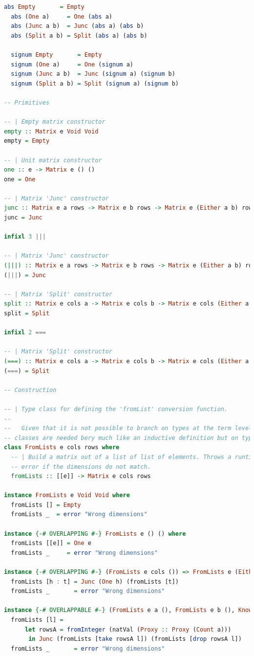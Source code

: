 \documentclass[
  oneside,
  11pt, a4paper,
  footinclude=true,
  headinclude=true,
  cleardoublepage=empty
]{scrbook}
\theoremstyle{definition}
\theoremstyle{definition}
\begin{document}
\begin{lstlisting}[language=Haskell, caption={Matrix.Internal},captionpos=b]
  abs Empty       = Empty
  abs (One a)     = One (abs a)
  abs (Junc a b)  = Junc (abs a) (abs b)
  abs (Split a b) = Split (abs a) (abs b)

  signum Empty       = Empty
  signum (One a)     = One (signum a)
  signum (Junc a b)  = Junc (signum a) (signum b)
  signum (Split a b) = Split (signum a) (signum b)

-- Primitives

-- | Empty matrix constructor
empty :: Matrix e Void Void
empty = Empty

-- | Unit matrix constructor
one :: e -> Matrix e () ()
one = One

-- | Matrix 'Junc' constructor
junc :: Matrix e a rows -> Matrix e b rows -> Matrix e (Either a b) rows
junc = Junc

infixl 3 |||

-- | Matrix 'Junc' constructor
(|||) :: Matrix e a rows -> Matrix e b rows -> Matrix e (Either a b) rows
(|||) = Junc

-- | Matrix 'Split' constructor
split :: Matrix e cols a -> Matrix e cols b -> Matrix e cols (Either a b)
split = Split

infixl 2 ===

-- | Matrix 'Split' constructor
(===) :: Matrix e cols a -> Matrix e cols b -> Matrix e cols (Either a b)
(===) = Split

-- Construction

-- | Type class for defining the 'fromList' conversion function.
--
--   Given that it is not possible to branch on types at the term level type
-- classes are needed bery much like an inductive definition but on types.
class FromLists e cols rows where
  -- | Build a matrix out of a list of list of elements. Throws a runtime
  -- error if the dimensions do not match.
  fromLists :: [[e]] -> Matrix e cols rows

instance FromLists e Void Void where
  fromLists [] = Empty
  fromLists _  = error "Wrong dimensions"

instance {-# OVERLAPPING #-} FromLists e () () where
  fromLists [[e]] = One e
  fromLists _     = error "Wrong dimensions"

instance {-# OVERLAPPING #-} (FromLists e cols ()) => FromLists e (Either () cols) () where
  fromLists [h : t] = Junc (One h) (fromLists [t])
  fromLists _       = error "Wrong dimensions"

instance {-# OVERLAPPABLE #-} (FromLists e a (), FromLists e b (), KnownNat (Count a)) => FromLists e (Either a b) () where
  fromLists [l] = 
      let rowsA = fromInteger (natVal (Proxy :: Proxy (Count a)))
       in Junc (fromLists [take rowsA l]) (fromLists [drop rowsA l])
  fromLists _       = error "Wrong dimensions"


\end{lstlisting}
\end{document}
